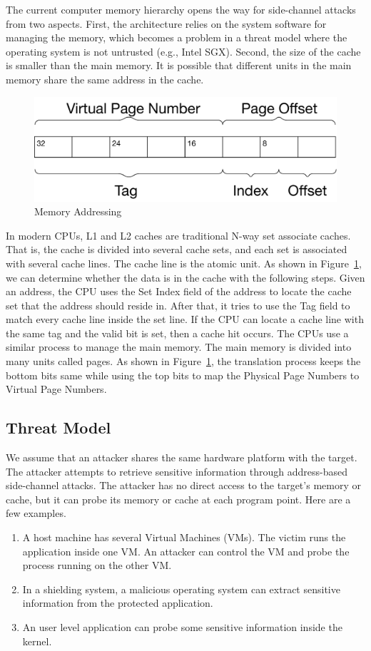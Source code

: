 The current computer memory hierarchy opens the way for side-channel attacks from two aspects. First, the architecture relies on the system software for managing the memory, which becomes a problem in a threat model where the operating system is not untrusted (e.g., Intel SGX). Second, the size of the cache is smaller than the main memory. It is possible that different units in the main memory share the same address in the cache. 
\begin{figure}
    \centering
    \includegraphics[width=.65\columnwidth]{./figures/chapter3/address.pdf}
    \caption{Memory Addressing}\label{fig:memory_address}
\end{figure}

In modern CPUs, L1 and L2 caches are traditional N-way set associate caches. That is, the cache is divided into several cache sets, and each set is associated with several cache lines. The cache line is the atomic unit. As shown in Figure~\ref{fig:memory_address}, we can determine whether the data is in the cache with the following steps.  Given an address, the CPU uses the \textsf{Set Index} field of the address to locate the cache set that the address should reside in. After that, it tries to use the \textsf{Tag} field to match every cache line inside the set line. If the CPU can locate a cache line with the same tag and the valid bit is set, then a cache hit occurs. The CPUs use a similar process to manage the main memory. The main memory is divided into many units called pages. As shown in Figure~\ref{fig:memory_address}, 
the translation process keeps the bottom bits same while using the top bits to map the Physical Page Numbers to Virtual Page Numbers.

\subsection{Threat Model}
We assume that an attacker shares the same hardware platform with the target.
The attacker attempts to retrieve sensitive information through address-based
side-channel attacks. The attacker has no direct access to the target's memory or cache,
but it can probe its memory or cache at each program point. Here are a few examples. 
\begin{enumerate}
\item A host machine has several Virtual Machines (VMs). The victim runs the application inside one VM. An attacker can control the VM and probe the process running on the other VM.
\item  In a shielding system, a malicious operating system can extract sensitive information from the protected application.
\item An user level application can probe some sensitive information inside the kernel.
\end{enumerate}

